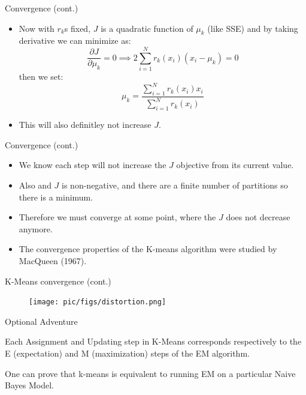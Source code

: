 \documentclass[serif, aspectratio=169]{beamer}
\begin{document}
\begin{frame}{Convergence (cont.)}
\begin{itemize}
    \item  Now with $r_k$s fixed, $J$ is a quadratic function of $\mu_k$ (like SSE) and by taking derivative we can minimize as:
$$
        \frac{ \partial J }{ \partial \mu_k } = 0 \implies 2 \sum_{i=1}^{N} r_k(x_i) \left(x_i - \mu_k \right) = 0
$$
then we set:
$$
        \mu_k = \frac{\sum_{i=1}^{N}{r_k(x_i)x_i}}{\sum_{i=1}^{N} r_k(x_i)}
$$
\item This will also definitley not increase $J$.

\end{itemize}
    
\end{frame}

\begin{frame}{Convergence (cont.)}
    \begin{itemize}
\item We know each step will not increase the $J$ objective from its current value.
\item  Also and $J$ is non-negative, and there are a finite number of partitions so there is a minimum.
 \item  Therefore we must converge at some point, where the $J$ does not decrease anymore.
\item  The convergence properties of the K-means algorithm were studied by MacQueen (1967).

    \end{itemize}
\end{frame}


\begin{frame}{K-Means convergence (cont.)}
    \begin{figure}
        \centering
        \texttt{[image: pic/figs/distortion.png]}
    \end{figure}
\end{frame}

\begin{frame}{Optional Adventure}
    \item  Each Assignment and Updating step in K-Means corresponds respectively to the E (expectation) and M (maximization) steps of the EM algorithm.
    \item One can prove that k-means is equivalent to running EM on a particular Naive Bayes Model.  
\end{frame}
\end{document}
